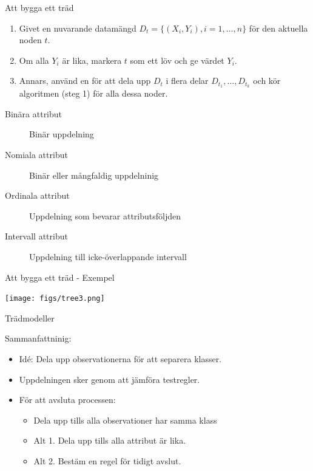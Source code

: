 \documentclass[10pt,english]{beamer}
\begin{document}
\begin{frame}{Att bygga ett träd}
    \begin{enumerate}
        \item Givet en nuvarande datamängd $D_t = \{(X_i, Y_i), i = 1,\ldots,n\}$ för den aktuella noden $t$.
        \item Om alla $Y_i$ är lika, markera $t$ som ett löv och ge värdet $Y_i$.
        \item Annars, använd en  för att dela upp $D_t$ i flera delar $D_{t_1}, \ldots, D_{t_k}$ och kör algoritmen (steg 1) för alla dessa noder.
    \end{enumerate}

    \begin{description}
        \item[Binära attribut] Binär uppdelning
        \item[Nomiala attribut] Binär eller mångfaldig uppdelninig
        \item[Ordinala attribut] Uppdelning som bevarar attributsföljden
        \item[Intervall attribut] Uppdelning till icke-överlappande intervall
    \end{description}
\end{frame}

\begin{frame}{Att bygga ett träd - Exempel}

    \texttt{[image: figs/tree3.png]}
    
\end{frame}

\begin{frame}{Trädmodeller}
    
    Sammanfattninig:
    \begin{itemize}
        \item Idé: Dela upp observationerna för att separera klasser.
        \item Uppdelningen sker genom att jämföra testregler.
        \item För att avsluta processen:
        \begin{itemize}
            \item Dela upp tills alla observationer har samma klass
            \item Alt 1. Dela upp tills alla attribut är lika.
            \item Alt 2. Bestäm en regel för tidigt avslut.
        \end{itemize}
    \end{itemize}

\end{frame}
\end{document}
